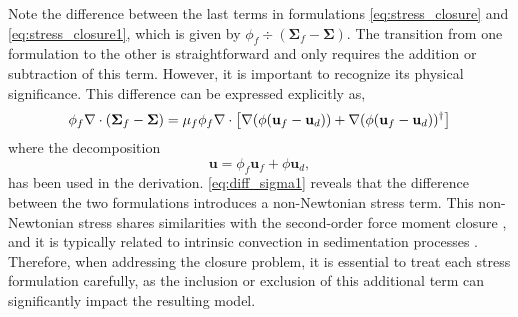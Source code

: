 Note the difference between the last terms in formulations \ref{eq:stress_closure} and \ref{eq:stress_closure1}, which is given by $\phi_f \div (\bm\Sigma_f -\bm\Sigma)$.
The transition from one formulation to the other is straightforward and only requires the addition or subtraction of this term. 
However, it is important to recognize its physical significance.
This difference can be expressed explicitly as,
\begin{equation}
    \phi_f \div(\bm\Sigma_f - \bm\Sigma) = \mu_f \phi_f \div \left[\grad (\phi (\textbf{u}_f - \textbf{u}_d)) + \grad (\phi (\textbf{u}_f - \textbf{u}_d))^\dagger \right]
    \label{eq:diff_sigma1}
\end{equation}
where the decomposition 
\begin{equation}
\textbf{u} = \phi_f \textbf{u}_f + \phi \textbf{u}_d,
\label{eq:u_mean} 
\end{equation}
has been used in the derivation.
\ref{eq:diff_sigma1} reveals that the difference between the two formulations introduces a non-Newtonian stress term.
This non-Newtonian stress shares similarities with the second-order force moment closure \citep{jackson1997locally,zhang1997momentum}, and it is typically related to intrinsic convection in sedimentation processes \citep{lhuillier2022}.
Therefore, when addressing the closure problem, it is essential to treat each stress formulation carefully, as the inclusion or exclusion of this additional term can significantly impact the resulting model.





